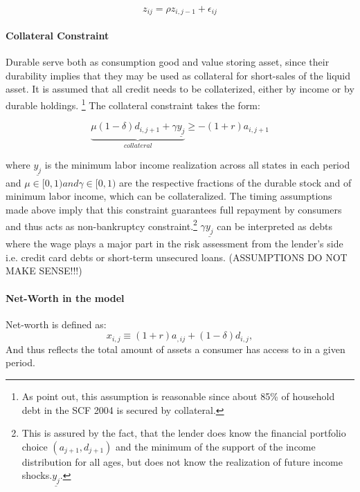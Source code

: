 \documentclass[a4paper,12pt,legno]{article}
\begin{document}
\begin{equation}\label{eq:ar1_shock}
z_{ij} = \rho z_{i,j-1}+\epsilon_{ij}
\end{equation}


\paragraph{Collateral Constraint}
Durable serve both as consumption good and value storing asset, since their durability implies that they may be used as collateral for short-sales of the liquid asset. It is assumed that all credit needs to be collaterized, either by income or by durable holdings. \footnote{As \citep{hintermaier2010} point out, this assumption is reasonable since about 85\% of household debt in the SCF 2004 is secured by collateral.} The collateral constraint takes the form:

\begin{equation}\label{eq:borrowing_constraint}
\underbrace{\mu(1-\delta)d_{i,j+1} + \gamma\underline{y_{j}}}_{collateral} \geq -(1+r)a_{i,j+1}
\end{equation}

where $\underline{y_{j}}$ is the minimum labor income realization across all states in each period and $\mu \in [0,1) and \gamma \in [0,1)$ are the respective fractions of the durable stock and of minimum labor income, which can be collateralized. The timing assumptions made above imply that this constraint guarantees full repayment by consumers and thus acts as non-bankruptcy constraint.\footnote{This is assured by the fact, that the lender does know the financial portfolio choice $(a_{j+1},d_{j+1})$ and the minimum of the support of the income distribution for all ages, but does not know the realization of future income shocks.$\underline{y_{j}}$.} $\gamma\underline{y_{j}}$ can be interpreted as debts where the wage plays a major part in the risk assessment from the lender's side i.e. credit card debts or short-term unsecured loans. 
(ASSUMPTIONS DO NOT MAKE SENSE!!!) 

\paragraph{Net-Worth in the model} 
Net-worth is defined as:
\begin{equation}\label{eq:net_worth}
x_{i,j} \equiv (1+r)a_{,ij} + (1-\delta)d_{i,j},
\end{equation}
And thus reflects the total amount of assets a consumer has access to in a given period.
\end{document}
